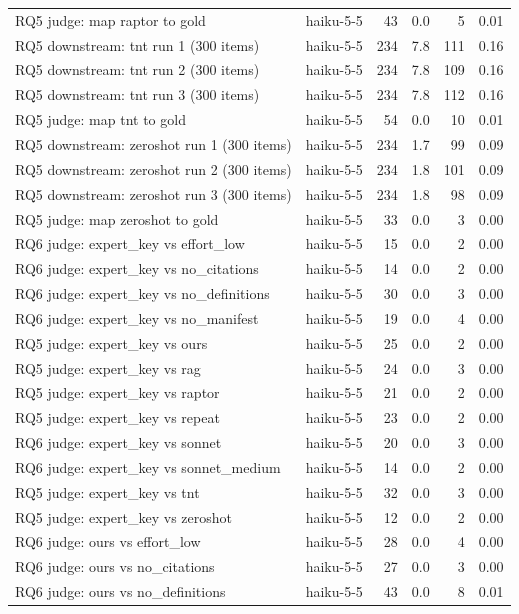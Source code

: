 \begin{tabular}{llrrrr}
RQ5 judge: map raptor to gold & haiku-5-5 & 43 & 0.0 & 5 & 0.01 \\
RQ5 downstream: tnt run 1 (300 items) & haiku-5-5 & 234 & 7.8 & 111 & 0.16 \\
RQ5 downstream: tnt run 2 (300 items) & haiku-5-5 & 234 & 7.8 & 109 & 0.16 \\
RQ5 downstream: tnt run 3 (300 items) & haiku-5-5 & 234 & 7.8 & 112 & 0.16 \\
RQ5 judge: map tnt to gold & haiku-5-5 & 54 & 0.0 & 10 & 0.01 \\
RQ5 downstream: zeroshot run 1 (300 items) & haiku-5-5 & 234 & 1.7 & 99 & 0.09 \\
RQ5 downstream: zeroshot run 2 (300 items) & haiku-5-5 & 234 & 1.8 & 101 & 0.09 \\
RQ5 downstream: zeroshot run 3 (300 items) & haiku-5-5 & 234 & 1.8 & 98 & 0.09 \\
RQ5 judge: map zeroshot to gold & haiku-5-5 & 33 & 0.0 & 3 & 0.00 \\
RQ6 judge: expert_key vs effort_low & haiku-5-5 & 15 & 0.0 & 2 & 0.00 \\
RQ6 judge: expert_key vs no_citations & haiku-5-5 & 14 & 0.0 & 2 & 0.00 \\
RQ6 judge: expert_key vs no_definitions & haiku-5-5 & 30 & 0.0 & 3 & 0.00 \\
RQ6 judge: expert_key vs no_manifest & haiku-5-5 & 19 & 0.0 & 4 & 0.00 \\
RQ5 judge: expert_key vs ours & haiku-5-5 & 25 & 0.0 & 2 & 0.00 \\
RQ5 judge: expert_key vs rag & haiku-5-5 & 24 & 0.0 & 3 & 0.00 \\
RQ5 judge: expert_key vs raptor & haiku-5-5 & 21 & 0.0 & 2 & 0.00 \\
RQ5 judge: expert_key vs repeat & haiku-5-5 & 23 & 0.0 & 2 & 0.00 \\
RQ6 judge: expert_key vs sonnet & haiku-5-5 & 20 & 0.0 & 3 & 0.00 \\
RQ6 judge: expert_key vs sonnet_medium & haiku-5-5 & 14 & 0.0 & 2 & 0.00 \\
RQ5 judge: expert_key vs tnt & haiku-5-5 & 32 & 0.0 & 3 & 0.00 \\
RQ5 judge: expert_key vs zeroshot & haiku-5-5 & 12 & 0.0 & 2 & 0.00 \\
RQ6 judge: ours vs effort_low & haiku-5-5 & 28 & 0.0 & 4 & 0.00 \\
RQ6 judge: ours vs no_citations & haiku-5-5 & 27 & 0.0 & 3 & 0.00 \\
RQ6 judge: ours vs no_definitions & haiku-5-5 & 43 & 0.0 & 8 & 0.01 \\

\end{tabular}
